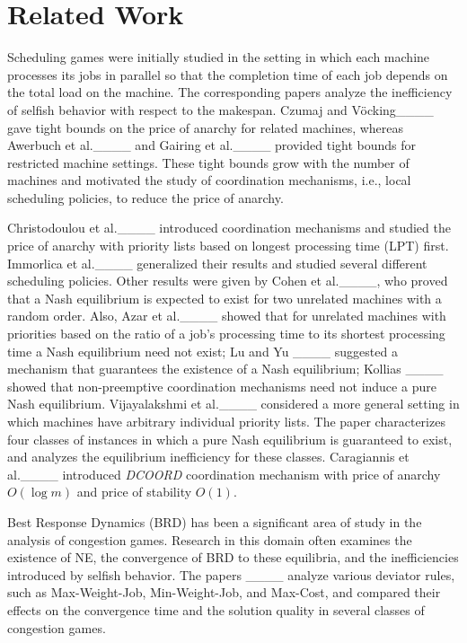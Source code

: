 \section{Related Work}
Scheduling games were initially studied in the setting in which each machine processes its jobs in parallel so that the completion time of each job depends on the total load on the machine. The corresponding papers analyze the inefficiency of selfish behavior with respect to the makespan. Czumaj and Vöcking____ gave tight bounds on the price of anarchy for related machines, whereas Awerbuch et al.____ and Gairing et al.____ provided tight bounds for restricted machine settings. %
These tight bounds grow with the number of machines and motivated the study of coordination mechanisms, i.e., local scheduling policies, to reduce the price of anarchy.

Christodoulou et al.____ introduced coordination mechanisms and studied the price of anarchy with priority lists based on longest processing time (LPT) first. Immorlica et al.____ generalized their results and studied several different scheduling policies. Other results were given by Cohen et al.____, who proved that a Nash equilibrium is expected to exist for two unrelated machines with a random order. Also, Azar et al.____ showed that for unrelated machines with priorities based on the ratio of a job's processing time to its shortest processing time a Nash equilibrium need not exist; Lu and Yu ____ suggested a mechanism that guarantees the existence of a Nash equilibrium; Kollias ____ showed that non-preemptive coordination mechanisms need not induce a pure Nash equilibrium. Vijayalakshmi et al.____ considered a more general setting in which machines have arbitrary individual priority lists. The paper characterizes four classes of instances in which a pure Nash equilibrium is guaranteed to exist, and analyzes the equilibrium inefficiency for these classes. Caragiannis et al.____ introduced {\em DCOORD} coordination mechanism with price of anarchy $O(\log m)$ and price of stability $O(1)$.

Best Response Dynamics (BRD) has been a significant area of study in the analysis of congestion games.
Research in this domain often examines the existence of NE, the convergence of BRD to these equilibria, and the inefficiencies introduced by selfish behavior. The papers ____ analyze various deviator rules, such as Max-Weight-Job, Min-Weight-Job, and Max-Cost, and compared their effects on the convergence time and the solution quality in several classes of congestion games.


